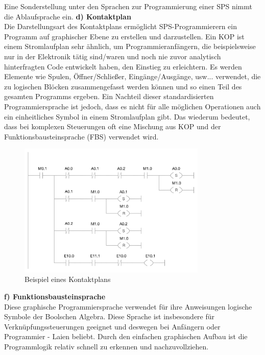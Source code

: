 	Eine Sonderstellung unter den Sprachen zur Programmierung einer SPS nimmt die Ablaufsprache ein.
	\textbf{d) Kontaktplan}\\
	Die Darstellungsart des Kontaktplans ermöglicht SPS-Programmierern ein Programm auf graphischer Ebene zu erstellen und darzustellen. Ein KOP ist einem Stromlaufplan sehr ähnlich, um Programmieranfängern, die beispielsweise nur in der Elektronik tätig sind/waren und noch nie zuvor analytisch hinterfragten Code entwickelt haben, den Einstieg zu erleichtern. Es werden Elemente wie Spulen, Öffner/Schließer, Eingänge/Ausgänge, usw... verwendet, die zu logischen Blöcken zusammengefasst werden können und so einen Teil des gesamten Programms ergeben. Ein Nachteil dieser standardisierten Programmiersprache ist jedoch, dass es nicht für alle möglichen Operationen auch ein einheitliches Symbol in einem Stromlaufplan gibt. Das wiederum bedeutet, dass bei komplexen Steuerungen oft eine Mischung aus KOP und der Funktionsbausteinsprache (FBS) verwendet wird.
	\begin{figure}[h!]
  		\centering
    	\includegraphics[width=0.8\textwidth]{graphics/stateoftheart/kop_Selfmade.png}
  		\caption{Beispiel eines Kontaktplans \cite{kontaktplan}}
	\end{figure}

	\newpage
	\textbf{f) Funktionsbausteinsprache}\\

	Diese graphische Programmiersprache verwendet für ihre Anweisungen logische Symbole der Boolschen Algebra. Diese Sprache ist insbesondere für Verknüpfungssteuerungen geeignet und deswegen bei Anfängern oder Programmier - Laien beliebt. Durch den einfachen graphischen Aufbau ist die Programmlogik relativ schnell zu erkennen und nachzuvollziehen.

